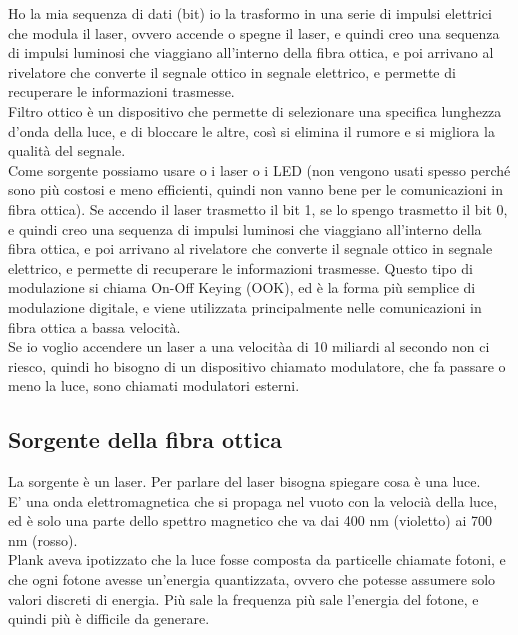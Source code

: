 Ho la mia sequenza di dati (bit) io la trasformo in una serie di impulsi elettrici che modula il laser, ovvero accende o spegne il laser, e quindi creo una sequenza di impulsi luminosi che viaggiano all'interno della fibra ottica, 
e poi arrivano al rivelatore che converte il segnale ottico in segnale elettrico, e permette di recuperare le informazioni trasmesse.\\

Filtro ottico è un dispositivo che permette di selezionare una specifica lunghezza d'onda della luce, e di bloccare le altre, così si elimina il rumore e si migliora la qualità del segnale.\\

Come sorgente possiamo usare o i laser o i LED (non vengono usati spesso perché sono più costosi e meno efficienti, quindi non vanno bene per le comunicazioni in fibra ottica).
Se accendo il laser trasmetto il bit 1, se lo spengo trasmetto il bit 0, e quindi creo una sequenza di impulsi luminosi che viaggiano all'interno della fibra ottica, e poi arrivano al rivelatore che converte il segnale ottico in segnale elettrico, e permette di recuperare le informazioni trasmesse.
Questo tipo di modulazione si chiama On-Off Keying (OOK), ed è la forma più semplice di modulazione digitale, e viene utilizzata principalmente nelle comunicazioni in fibra ottica a bassa velocità.\\

Se io voglio accendere un laser a una velocitàa di 10 miliardi al secondo non ci riesco, quindi ho bisogno di un dispositivo chiamato modulatore, che fa passare o meno la luce, sono chiamati
modulatori esterni.\\

\subsection{Sorgente della fibra ottica}
La sorgente è un laser. Per parlare del laser bisogna spiegare cosa è una luce.\\
E' una onda elettromagnetica che si propaga nel vuoto con la velocià della luce, ed è solo una parte dello spettro magnetico che va dai 400 nm (violetto) ai 700 nm (rosso).\\

Plank aveva ipotizzato che la luce fosse composta da particelle chiamate fotoni, e che ogni fotone avesse un'energia quantizzata, ovvero che potesse assumere solo valori discreti di energia.
Più sale la frequenza più sale l'energia del fotone, e quindi più è difficile da generare.\\

